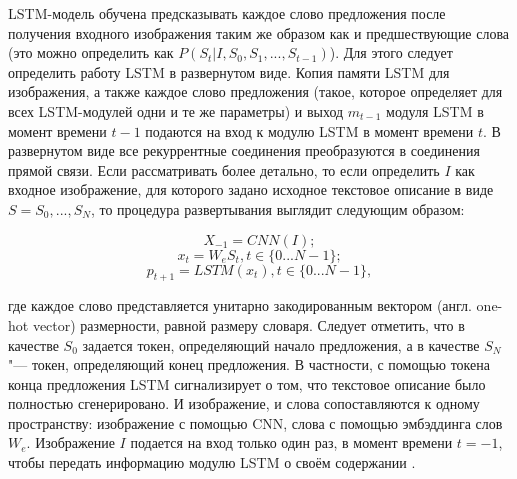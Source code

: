 \documentclass[bachelor, och, coursework]{SCWorks}
\begin{document}
        LSTM-модель обучена предсказывать каждое слово предложения после
        получения входного изображения таким же образом как и предшествующие
        слова (это можно определить как $P(S_t | I, S_0, S_1, ..., S_{t - 1})$).
        Для этого следует определить работу LSTM в развернутом виде. Копия
        памяти LSTM для изображения, а также каждое слово предложения (такое,
        которое определяет для всех LSTM-модулей одни и те же параметры) и выход
        $m_{t - 1}$ модуля LSTM в момент времени $t - 1$ подаются на вход к
        модулю LSTM в момент времени $t$. В развернутом виде все рекуррентные
        соединения преобразуются в соединения прямой связи. Если рассматривать
        более детально, то если определить $I$ как входное изображение, для
        которого задано исходное текстовое описание в виде $S = S_0, ..., S_N$,
        то процедура развертывания выглядит следующим образом:
        

        \[X_{-1} = CNN(I) ;\]
        \[x_t = W_e S_t, t \in \{0...N - 1 \} ;\]
        \[p_{t + 1} = LSTM(x_t), t \in \{0...N - 1 \} ,\]

        где каждое слово представляется унитарно закодированным вектором (англ.
        one-hot vector) размерности, равной размеру словаря. Следует отметить,
        что в качестве $S_0$ задается токен, определяющий начало предложения, а
        в качестве $S_N$ "--- токен, определяющий конец предложения. В
        частности, с помощью токена конца предложения LSTM сигнализирует о том,
        что текстовое описание было полностью сгенерировано. И изображение, и
        слова сопоставляются к одному пространству: изображение с помощью CNN,
        слова с помощью эмбэддинга слов $W_e$. Изображение $I$ подается на вход
        только один раз, в момент времени $t = -1$, чтобы передать информацию
        модулю LSTM о своём содержании \cite{dataset1}.
\end{document}

